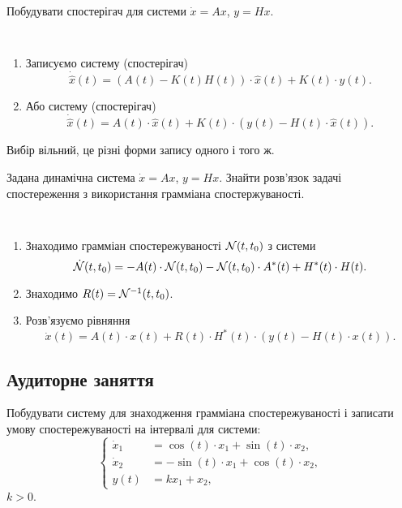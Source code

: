 \begin{problem*}
    Побудувати спостерігач для системи $\dot x = A x$, $y = H x$.
\end{problem*}

\begin{algorithm} \tt
    \begin{enumerate}
        \item Записуємо систему (спостерігач) \[ \dot{\hat{x}} (t) = (A (t) - K (t) H (t)) \cdot \hat x (t) + K(t) \cdot y(t).\]
        \item Або систему (спостерігач) \[ \dot{\hat{x}} (t) = A (t) \cdot \hat x (t) + K(t) \cdot (y(t) - H(t) \cdot \hat x(t)).\]
    \end{enumerate}
    Вибір вільний, це різні форми запису одного і того ж.
\end{algorithm}

\begin{problem*}
    Задана динамічна система $\dot x = A x$, $y = H x$. Знайти розв'язок задачі спостереження з використання грамміана спостержуваності.
\end{problem*}

\begin{algorithm} \tt
    \begin{enumerate}
        \item Знаходимо грамміан спостережуваності $\mathcal{N}(t,t_0)$ з сис\-те\-ми \[ \dot {\mathcal{N}}(t, t_0) = -A(t) \cdot \mathcal{N}(t, t_0) - \mathcal{N}(t, t_0) \cdot A^*(t) + H^*(t) \cdot H(t). \]

        \item Знаходимо $R(t) = \mathcal{N}^{-1}(t, t_0)$.

        \item Розв'язуємо рівняння \[ \dot x(t) = A(t) \cdot x(t) + R(t) \cdot H^*(t) \cdot (y(t) - H(t) \cdot x(t)). \]
    \end{enumerate}
\end{algorithm}

\newpage

\subsection{Аудиторне заняття}

\begin{problem}
	Побудувати систему для знаходження грамміана спостережуваності і записати умову спостережуваності на інтервалі для системи: \[
	\left\{
		\begin{aligned}
			\dot x_1 &= \cos(t) \cdot x_1 + \sin(t) \cdot x_2, \\
			\dot x_2 &= - \sin(t) \cdot x_1 + \cos(t) \cdot x_2, \\
			y(t) &= k x_1 + x_2,
		\end{aligned}
	\right.
	\]
	$k > 0$.
\end{problem}

